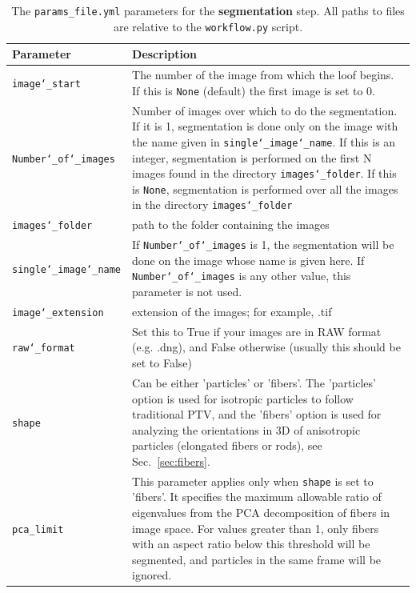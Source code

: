 \documentclass[10pt,a4paper]{article}
\begin{document}
\begin{table}[!ht]
	\centering
	\caption{The \texttt{params\_file.yml} parameters for the \textbf{segmentation} step. All paths to files are relative to the \texttt{workflow.py} script. \label{tab:segment_params}}
	\begin{tabular}{l m{13cm}}
		\hline
		Parameter & Description\\
		\hline
		
		\texttt{image\char`_start} & The number of the image from which the loof begins. If this is \texttt{None} (default) the first image is set to 0.\\[.3em]
		
		\texttt{Number\char`_of\char`_images} & Number of images over which to do the segmentation. If it is 1, segmentation is done only on the image with the name given in \texttt{single\char`_image\char`_name}. If this is an integer, segmentation is performed on the first N images found in the directory \texttt{images\char`_folder}. If this is \texttt{None}, segmentation is performed over all the images in the directory \texttt{images\char`_folder} \\[.3em]
		
		\texttt{images\char`_folder} & path to the folder containing the images\\[.3em]
		
		\texttt{single\char`_image\char`_name} & If \texttt{Number\char`_of\char`_images} is 1, the segmentation will be done on the image whose name is given here. If \texttt{Number\char`_of\char`_images} is any other value, this parameter is not used. \\[.3em]
		
		\texttt{image\char`_extension} & extension of the images; for example, .tif\\[.3em]
		
		\texttt{raw\char`_format} & Set this to True if your images are in RAW format (e.g. .dng), and False otherwise (usually this should be set to False)\\[.3em]
		
		\texttt{shape} & Can be either 'particles' or 'fibers'. The 'particles' option is used for isotropic particles to follow traditional PTV, and the 'fibers' option is used for analyzing the orientations in 3D of anisotropic particles (elongated fibers or rods), see Sec.~\ref{sec:fibers}. \\[.3em]
		
		\texttt{pca\_limit} & This parameter applies only when \texttt{shape} is set to 'fibers'. It specifies the maximum allowable ratio of eigenvalues from the PCA decomposition of fibers in image space. For values greater than 1, only fibers with an aspect ratio below this threshold will be segmented, and particles in the same frame will be ignored.  \\[.3em]
		

\end{tabular}
\end{table}
\end{document}
